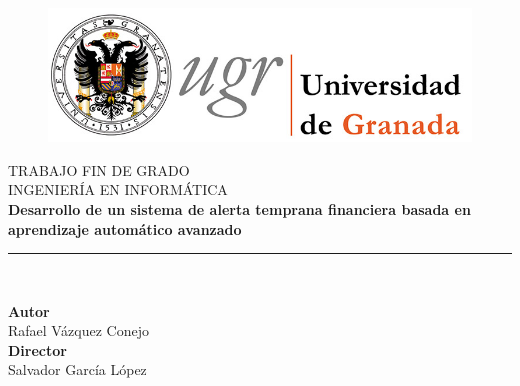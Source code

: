 
\begin{titlepage}
	\newlength{\centeroffset}
	\setlength{\centeroffset}{-0.5\oddsidemargin}
	\addtolength{\centeroffset}{0.5\evensidemargin}
	\thispagestyle{empty}
	
	\vspace{3cm}
	
	\begin{figure}[h!]
		\centering
		\includegraphics[width=1\linewidth]{figures/logo}
		\label{fig:logo}
	\end{figure}
	
	\vspace{0.5cm}
	\noindent\hspace*{\centeroffset}\begin{minipage}{\textwidth}
		
		\centering
		
		\textsc{ \Large TRABAJO FIN DE GRADO\\[0.2cm]}
		\textsc{ INGENIERÍA EN INFORMÁTICA}\\[1cm]
		{\Huge\bfseries Desarrollo de un sistema de alerta temprana financiera basada en aprendizaje automático avanzado\\
		}
		\noindent\rule[-1ex]{\textwidth}{3pt}\\[3.5ex]
	\end{minipage}
	

\vspace{1cm}
	\noindent\hspace*{\centeroffset}\begin{minipage}{\textwidth}
		\centering
		
		\textbf{Autor}\\ {Rafael Vázquez Conejo}\\[2.5ex]
		\textbf{Director}\\
		{Salvador García López}\\[2cm]

	\end{minipage}

		


\end{titlepage}
